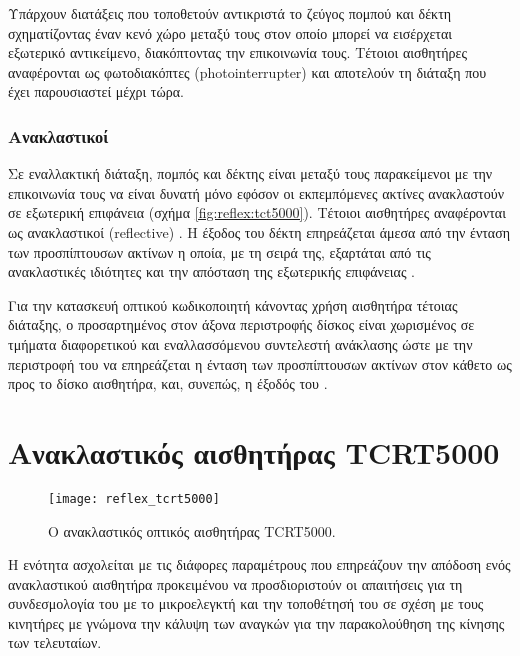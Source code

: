 Υπάρχουν διατάξεις που τοποθετούν αντικριστά το ζεύγος πομπού και δέκτη
σχηματίζοντας έναν κενό χώρο μεταξύ τους στον οποίο μπορεί να εισέρχεται
εξωτερικό αντικείμενο, διακόπτοντας την επικοινωνία τους. Τέτοιοι αισθητήρες
αναφέρονται ως φωτοδιακόπτες
(photointerrupter) \parencite[3]{lynch02} και αποτελούν τη διάταξη που
έχει παρουσιαστεί μέχρι τώρα.


\subsubsection{Ανακλαστικοί}

Σε εναλλακτική διάταξη, πομπός και δέκτης είναι μεταξύ τους παρακείμενοι με την
επικοινωνία τους να είναι δυνατή μόνο εφόσον οι εκπεμπόμενες ακτίνες ανακλαστούν
σε εξωτερική επιφάνεια (σχήμα \ref{fig:reflex:tct5000}).
Τέτοιοι αισθητήρες αναφέρονται ως ανακλαστικοί 
(reflective) \parencite[3]{lynch02}.
Η έξοδος του δέκτη επηρεάζεται άμεσα από την ένταση των προσπίπτουσων ακτίνων η
οποία, με τη σειρά της, εξαρτάται από τις ανακλαστικές ιδιότητες και την
απόσταση της εξωτερικής επιφάνειας \parencite{vishay06}.

Για την κατασκευή
οπτικού κωδικοποιητή κάνοντας χρήση αισθητήρα τέτοιας διάταξης, ο προσαρτημένος
στον άξονα περιστροφής δίσκος είναι χωρισμένος σε τμήματα διαφορετικού και
εναλλασσόμενου συντελεστή ανάκλασης ώστε με την περιστροφή του να επηρεάζεται η
ένταση των προσπίπτουσων ακτίνων στον κάθετο ως προς το δίσκο αισθητήρα, και,
συνεπώς, η έξοδός του \parencite[11]{vishay02}.


\section{Ανακλαστικός αισθητήρας TCRT5000}

\begin{figure}
    \caption{Ο ανακλαστικός οπτικός αισθητήρας TCRT5000.
    \label{fig:reflex:tcrt5000}}
    \begin{center}
    \texttt{[image: reflex\_tcrt5000]}
    \end{center}
\end{figure}

Η ενότητα ασχολείται με τις διάφορες παραμέτρους που επηρεάζουν την απόδοση ενός
ανακλαστικού αισθητήρα προκειμένου να προσδιοριστούν οι απαιτήσεις για τη
συνδεσμολογία του με το μικροελεγκτή και την τοποθέτησή του σε σχέση με τους
κινητήρες με γνώμονα την κάλυψη των αναγκών για την παρακολούθηση της κίνησης
των τελευταίων.

